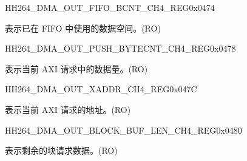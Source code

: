     
    \begin{register}{H}{H264\_DMA\_OUT\_FIFO\_BCNT\_CH4\_REG}{0x0474}\label{regdesc:H264DMAOUTFIFOBCNTCH4REG}
    \regnewline%
    \begin{regdesc}\begin{reglist}
    \label{fielddesc:H264DMAOUTCMDFIFOOUTFIFOBCNTCH4}\item [H264\_DMA\_OUT\_CMDFIFO\_OUTFIFO\_BCNT\_CH4] 表示已在 FIFO 中使用的数据空间。(RO)
    \end{reglist}\end{regdesc}
    \end{register}
    
    
    \begin{register}{H}{H264\_DMA\_OUT\_PUSH\_BYTECNT\_CH4\_REG}{0x0478}\label{regdesc:H264DMAOUTPUSHBYTECNTCH4REG}
    \regnewline%
    \begin{regdesc}\begin{reglist}
    \label{fielddesc:H264DMAOUTCMDFIFOPUSHBYTECNTCH4}\item [H264\_DMA\_OUT\_CMDFIFO\_PUSH\_BYTECNT\_CH4] 表示当前 AXI 请求中的数据量。(RO)
    \end{reglist}\end{regdesc}
    \end{register}
    
    
    \begin{register}{H}{H264\_DMA\_OUT\_XADDR\_CH4\_REG}{0x047C}\label{regdesc:H264DMAOUTXADDRCH4REG}
    \regnewline%
    \begin{regdesc}\begin{reglist}
    \label{fielddesc:H264DMAOUTCMDFIFOXADDRCH4}\item [H264\_DMA\_OUT\_CMDFIFO\_XADDR\_CH4] 表示当前 AXI 请求的地址。(RO)
    \end{reglist}\end{regdesc}
    \end{register}
    
    
    \begin{register}{H}{H264\_DMA\_OUT\_BLOCK\_BUF\_LEN\_CH4\_REG}{0x0480}\label{regdesc:H264DMAOUTBLOCKBUFLENCH4REG}
    \regnewline%
    \begin{regdesc}\begin{reglist}
    \label{fielddesc:H264DMAOUTBLOCKBUFLENCH4}\item [H264\_DMA\_OUT\_BLOCK\_BUF\_LEN\_CH4] 表示剩余的块请求数据。(RO)
    \end{reglist}\end{regdesc}
    \end{register}
    
